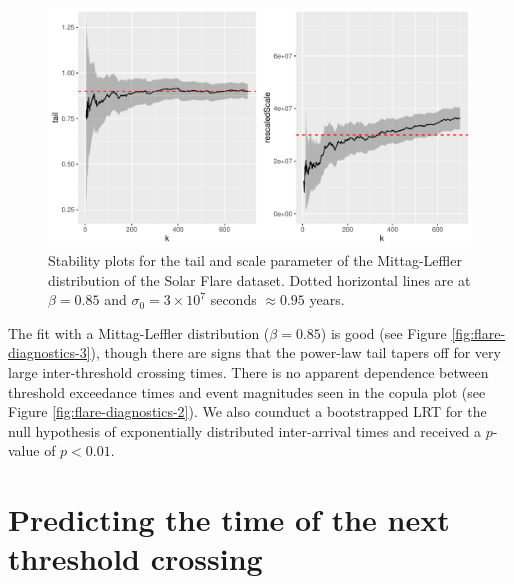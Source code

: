 \documentclass[]{elsarticle} %
\begin{document}
\begin{figure}
\includegraphics[width=\textwidth]{article_springer_files/figure-latex/solar-flare-tail-scale-1} \caption{\label{fig:flares} Stability plots for the tail and scale parameter of the Mittag-Leffler distribution of the Solar Flare dataset. Dotted horizontal lines are at $\beta = 0.85$ and $\sigma_0 = 3 \times 10^7$ seconds $\approx 0.95$ years.}\label{fig:solar-flare-tail-scale}
\end{figure}

The fit with a Mittag-Leffler distribution (\(\beta = 0.85\)) is good
(see Figure \ref{fig:flare-diagnostics-3}), though there are signs that
the power-law tail tapers off for very large inter-threshold crossing
times. There is no apparent dependence between threshold exceedance
times and event magnitudes seen in the copula plot (see Figure
\ref{fig:flare-diagnostics-2}). We also counduct a bootstrapped LRT for
the null hypothesis of exponentially distributed inter-arrival times and
received a \(p\)-value of \(p<0.01\).

\hypertarget{predicting-the-time-of-the-next-threshold-crossing}{%
\section{Predicting the time of the next threshold
crossing}\label{predicting-the-time-of-the-next-threshold-crossing}}
\end{document}
